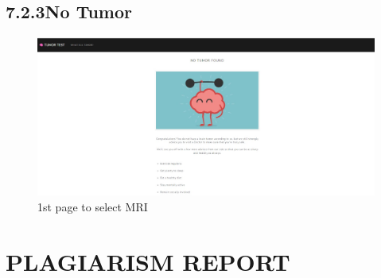 \documentclass[oneside,a4paper,12pt]{book}
\begin{document}
\begin{appendices}
\section*{7.2.3\hspace*{10pt}No Tumor}
\begin{Center}
\begin{figure}[H]
	\begin{Center}
		\includegraphics[width=\linewidth]{no_detected.jpeg}
		\caption{1st page to select MRI }
		\label{fig:EndorsersCommitters_Role}
	\end{Center}
\end{figure}
\end{Center}\par

\vspace{\baselineskip}

\vspace{\baselineskip}

\vspace{\baselineskip}

\vspace{\baselineskip}

\vspace{\baselineskip}

\vspace{\baselineskip}

\setlength{\parskip}{15.0pt}
\setlength{\parskip}{9.96pt}
\setlength{\parskip}{15.0pt}
\chapter{PLAGIARISM REPORT}\par

\vspace{\baselineskip}
\setlength{\parskip}{9.96pt}



\end{appendices}
\end{document}
